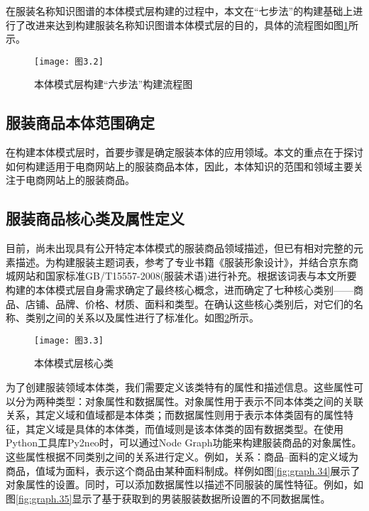\documentclass[bachelor_p]{hdu-thesis}
\begin{document}
在服装名称知识图谱的本体模式层构建的过程中，本文在“七步法”的构建基础上进行了改进来达到构建服装名称知识图谱本体模式层的目的，具体的流程图如图\ref{fig:graph.32}所示。

\begin{figure}[h]
  \centering
  \texttt{[image: 图3.2]}
  \caption{本体模式层构建“六步法”构建流程图}\label{fig:graph.32}
\end{figure}


\subsection{服装商品本体范围确定}

在构建本体模式层时，首要步骤是确定服装本体的应用领域。本文的重点在于探讨如何构建适用于电商网站上的服装商品本体，因此，本体知识的范围和领域主要关注于电商网站上的服装商品。

\subsection{服装商品核心类及属性定义}

目前，尚未出现具有公开特定本体模式的服装商品领域描述，但已有相对完整的元素描述。为构建服装主题词表，参考了专业书籍《服装形象设计》\cite{book29}，并结合京东商城网站和国家标准GB/T15557-2008(服装术语)进行补充。根据该词表与本文所要构建的本体模式层自身需求确定了最终核心概念，进而确定了七种核心类别——商品、店铺、品牌、价格、材质、面料和类型。在确认这些核心类别后，对它们的名称、类别之间的关系以及属性进行了标准化。如图\ref{fig:graph.33}所示。

\begin{figure}[h]
  \centering
  \texttt{[image: 图3.3]}
  \caption{本体模式层核心类}\label{fig:graph.33}
\end{figure}

为了创建服装领域本体类，我们需要定义该类特有的属性和描述信息。这些属性可以分为两种类型：对象属性和数据属性。对象属性用于表示不同本体类之间的关联关系，其定义域和值域都是本体类；而数据属性则用于表示本体类固有的属性特征，其定义域是具体的本体类，而值域则是该本体类的固有数据类型。在使用Python工具库Py2neo时，可以通过Node Graph功能来构建服装商品的对象属性。这些属性根据不同类别之间的关系进行定义。例如，关系：商品--面料的定义域为商品，值域为面料，表示这个商品由某种面料制成。样例如图\ref{fig:graph.34}展示了对象属性的设置。同时，可以添加数据属性以描述不同服装的属性特征。例如，如图\ref{fig:graph.35}显示了基于获取到的男装服装数据所设置的不同数据属性。
\end{document}
